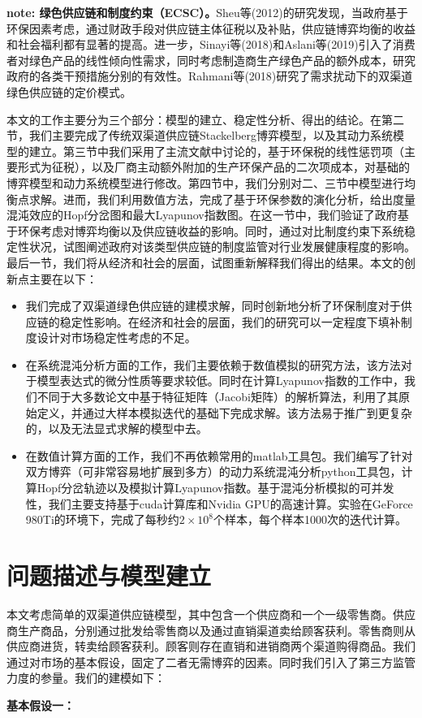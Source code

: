 \documentclass{article}
\begin{document}
\par \textbf{note: 绿色供应链和制度约束（ECSC）\cite{2005Beamon}。}Sheu等(2012)\cite{2012Sheu}的研究发现，当政府基于环保因素考虑，通过财政手段对供应链主体征税以及补贴，供应链博弈均衡的收益和社会福利都有显著的提高。进一步，Sinayi等(2018)\cite{2018Sinayi}和Aslani等(2019)\cite{2019Aslani}引入了消费者对绿色产品的线性倾向性需求，同时考虑制造商生产绿色产品的额外成本，研究政府的各类干预措施分别的有效性。Rahmani等(2018)\cite{2018Rahami}研究了需求扰动下的双渠道绿色供应链的定价模式。
\par 本文的工作主要分为三个部分：模型的建立、稳定性分析、得出的结论。在第二节，我们主要完成了传统双渠道供应链Stackelberg博弈模型，以及其动力系统模型的建立。第三节中我们采用了主流文献中讨论的，基于环保税的线性惩罚项（主要形式为征税），以及厂商主动额外附加的生产环保产品的二次项成本，对基础的博弈模型和动力系统模型进行修改。第四节中，我们分别对二、三节中模型进行均衡点求解。进而，我们利用数值方法，完成了基于环保参数的演化分析，给出度量混沌效应的Hopf分岔图和最大Lyapunov指数图。在这一节中，我们验证了政府基于环保考虑对博弈均衡以及供应链收益的影响。同时，通过对比制度约束下系统稳定性状况，试图阐述政府对该类型供应链的制度监管对行业发展健康程度的影响。最后一节，我们将从经济和社会的层面，试图重新解释我们得出的结果。本文的创新点主要在以下：%
\begin{itemize}
    \item 我们完成了双渠道绿色供应链的建模求解，同时创新地分析了环保制度对于供应链的稳定性影响。在经济和社会的层面，我们的研究可以一定程度下填补制度设计对市场稳定性考虑的不足。
    \item 在系统混沌分析方面的工作，我们主要依赖于数值模拟的研究方法，该方法对于模型表达式的微分性质等要求较低。同时在计算Lyapunov指数的工作中，我们不同于大多数论文中基于特征矩阵（Jacobi矩阵）的解析算法，利用了其原始定义，并通过大样本模拟迭代的基础下完成求解。该方法易于推广到更复杂的，以及无法显式求解的模型中去。
    \item 在数值计算方面的工作，我们不再依赖常用的matlab工具包。我们编写了针对双方博弈（可非常容易地扩展到多方）的动力系统混沌分析python工具包，计算Hopf分岔轨迹以及模拟计算Lyapunov指数。基于混沌分析模拟的可并发性，我们主要支持基于cuda计算库和Nvidia GPU的高速计算。实验在GeForce 980Ti的环境下，完成了每秒约$2\times10^8$个样本，每个样本1000次的迭代计算。
\end{itemize}
\section{问题描述与模型建立}
\par 本文考虑简单的双渠道供应链模型，其中包含一个供应商和一个一级零售商。供应商生产商品，分别通过批发给零售商以及通过直销渠道卖给顾客获利。零售商则从供应商进货，转卖给顾客获利。顾客则存在直销和进销商两个渠道购得商品。我们通过对市场的基本假设，固定了二者无需博弈的因素。同时我们引入了第三方监管力度的参量。我们的建模如下：
\par \textbf{基本假设一：}
\end{document}
